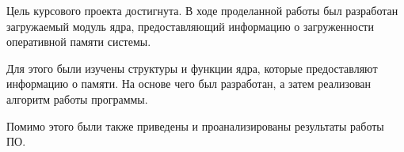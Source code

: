 
Цель курсового проекта достигнута. В ходе проделанной работы был разработан загружаемый модуль ядра, предоставляющий информацию о загруженности оперативной памяти системы.

Для этого были изучены структуры и функции ядра, которые предоставляют информацию о памяти. На основе чего был разработан, а затем реализован алгоритм работы программы.

Помимо этого были также приведены и проанализированы результаты работы ПО.